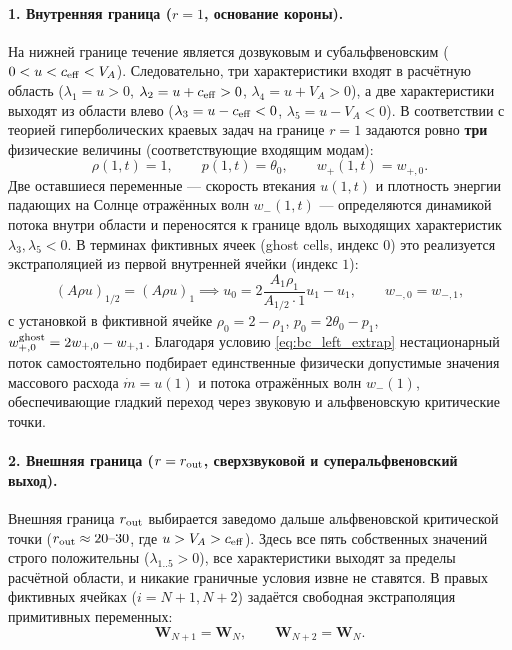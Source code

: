 \documentclass[11pt,a4paper]{article}
\begin{document}
\paragraph{1. Внутренняя граница ($r = 1$, основание короны).}
На нижней границе течение является дозвуковым и субальфвеновским ($0 < u < c_{\rm eff} < V_A$). Следовательно, три характеристики входят в расчётную область ($\lambda_1 = u > 0$, $\lambda_2 = u + c_{\rm eff} > 0$, $\lambda_4 = u + V_A > 0$), а две характеристики выходят из области влево ($\lambda_3 = u - c_{\rm eff} < 0$, $\lambda_5 = u - V_A < 0$). В соответствии с теорией гиперболических краевых задач на границе $r = 1$ задаются ровно \textbf{три} физические величины (соответствующие входящим модам):
\begin{equation}
\rho(1, t) = 1, \qquad p(1, t) = \theta_0, \qquad w_+(1, t) = w_{+,0}.
\label{eq:bc_left_fixed}
\end{equation}
Две оставшиеся переменные --- скорость втекания $u(1, t)$ и плотность энергии падающих на Солнце отражённых волн $w_-(1, t)$ --- определяются динамикой потока внутри области и переносятся к границе вдоль выходящих характеристик $\lambda_3, \lambda_5 < 0$. В терминах фиктивных ячеек (ghost cells, индекс $0$) это реализуется экстраполяцией из первой внутренней ячейки (индекс $1$):
\begin{equation}
(A\rho u)_{1/2} = (A\rho u)_1 \implies u_0 = 2\frac{A_1\rho_1}{A_{1/2}\cdot 1}u_1 - u_1, \qquad w_{-,0} = w_{-,1},
\label{eq:bc_left_extrap}
\end{equation}
с установкой в фиктивной ячейке $\rho_0 = 2 - \rho_1$, $p_0 = 2\theta_0 - p_1$, $w_{+,0}^{\rm ghost} = 2w_{+,0} - w_{+,1}$. Благодаря условию \eqref{eq:bc_left_extrap} нестационарный поток самостоятельно подбирает единственные физически допустимые значения массового расхода $\dot{m} = u(1)$ и потока отражённых волн $w_-(1)$, обеспечивающие гладкий переход через звуковую и альфвеновскую критические точки.

\paragraph{2. Внешняя граница ($r = r_{\rm out}$, сверхзвуковой и суперальфвеновский выход).}
Внешняя граница $r_{\rm out}$ выбирается заведомо дальше альфвеновской критической точки ($r_{\rm out} \approx 20\text{--}30$, где $u > V_A > c_{\rm eff}$). Здесь все пять собственных значений строго положительны ($\lambda_{1..5} > 0$), все характеристики выходят за пределы расчётной области, и никакие граничные условия извне не ставятся. В правых фиктивных ячейках ($i = N+1, N+2$) задаётся свободная экстраполяция примитивных переменных:
\begin{equation}
\bm{W}_{N+1} = \bm{W}_N, \qquad \bm{W}_{N+2} = \bm{W}_N.
\label{eq:bc_right_outflow}
\end{equation}
\end{document}
